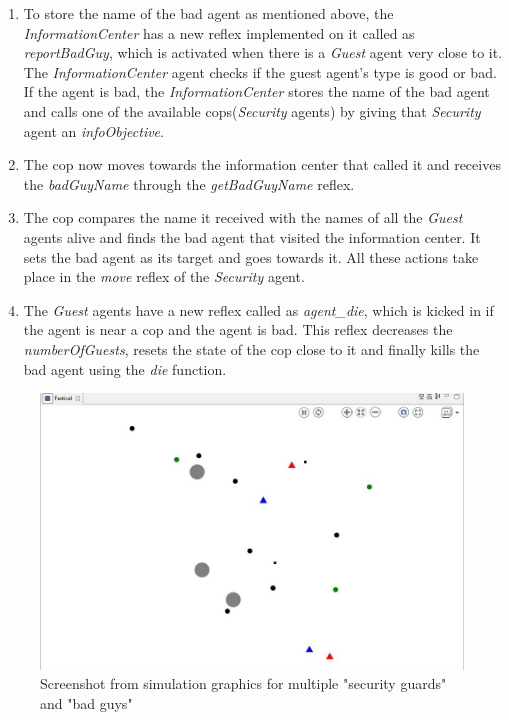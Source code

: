 \documentclass[a4paper]{article}
\begin{document}
\begin{enumerate}
    \item To store the name of the bad agent as mentioned above, the \textit{InformationCenter} has a new reflex implemented on it called as \textit{reportBadGuy}, which is activated when there is a \textit{Guest} agent very close to it. The \textit{InformationCenter} agent checks if the guest agent's type is good or bad. If the agent is bad, the \textit{InformationCenter} stores the name of the bad agent and calls one of the available cops(\textit{Security} agents) by giving that \textit{Security} agent an \textit{infoObjective}. 
    \item The cop now moves towards the information center that called it and receives the \textit{badGuyName} through the \textit{getBadGuyName} reflex.
    \item The cop compares the name it received with the names of all the \textit{Guest} agents alive and finds the bad agent that visited the information center. It sets the bad agent as its target and goes towards it. All these actions take place in the \textit{move} reflex of the \textit{Security} agent.
    \item The \textit{Guest} agents have a new reflex called as \textit{agent\_die}, which is kicked in if the agent is near a cop and the agent is bad. This reflex decreases the \textit{numberOfGuests}, resets the state of the cop close to it and finally kills the bad agent using the \textit{die} function.
\end{enumerate}

\begin{figure}[H]
    \centering
    \includegraphics[scale=0.5]{cop_sim.jpg}
    \caption{Screenshot from simulation graphics for multiple "security guards" and "bad guys"}
    \label{fig:cop_sim}
\end{figure}
\end{document}
